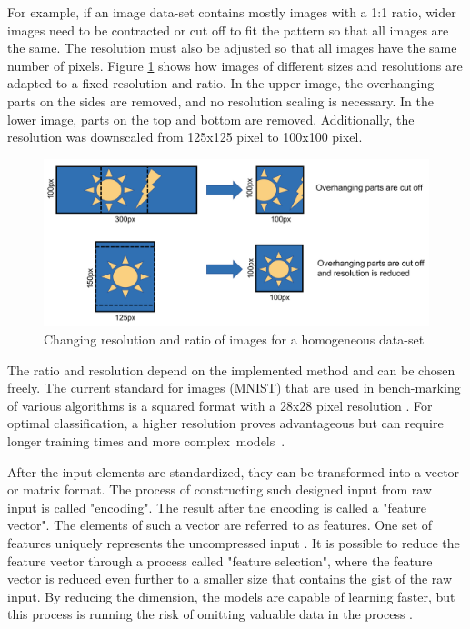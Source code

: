 For example, if an image data-set contains mostly images with a 1:1 ratio, wider images need to be contracted or cut off to fit the pattern so that all images are the same. The resolution must also be adjusted so that all images have the same number of pixels.
\newpage
Figure \ref{fig:pixel} shows how images of different sizes and resolutions are adapted to a fixed resolution and ratio. In the upper image, the overhanging parts on the sides are removed, and no resolution scaling is necessary. In the lower image, parts on the top and bottom are removed. Additionally, the resolution was downscaled from 125x125 pixel to 100x100 pixel. 

\begin{figure}[H]
	\centering
	\includegraphics[width=0.95\linewidth]{IMGs/pixel.png}
	\caption{Changing resolution and ratio of images for a homogeneous data-set}
	\label{fig:pixel}
\end{figure}

The ratio and resolution depend on the implemented method and can be chosen freely. 
The current standard for images (MNIST) that are used in bench-marking of various algorithms is a squared format with a 28x28 pixel resolution \cite{Baldominos}.\newline
For optimal classification, a higher resolution proves advantageous but can require longer training times and more complex~models~\cite{Kannojia,Huang}.

After the input elements are standardized, they can be transformed into a vector or matrix format. The process of constructing such designed input from raw input is called "encoding". The result after the encoding is called a "feature vector". The elements of such a vector are referred to as features. One set of features uniquely represents the uncompressed input \cite{Theodoridis}. It is possible to reduce the feature vector through a process called "feature selection", where the feature vector is reduced even further to a smaller size that contains the gist of the raw input. By reducing the dimension, the models are capable of learning faster, but this process is running the risk of omitting valuable data in the process \cite{Janiesch}.

